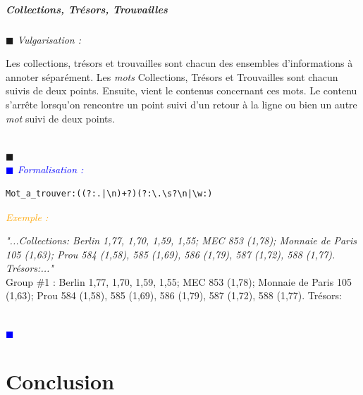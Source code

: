 \documentclass[a4paper, 11pt]{report}
\newenvironment{vulgarisation}
    {
    \textit{\textcolor{dark-blue}{$\blacksquare$  Vulgarisation : \\}}

    }
    {
    ~\\\textcolor{dark-blue}{$\blacksquare$}\\
    }
\newenvironment{formalisation}
    {
    \textit{\textcolor{blue}{$\blacksquare$  Formalisation : \\}}
    }
    {
    ~\\\textcolor{blue}{$\blacksquare$}\\
    }
\newenvironment{exemple}
    {
    \textit{\textcolor{orange}{
    Exemple : \\}}
    }
    {\\
    }
\begin{document}
\subsubsection{Collections, Trésors, Trouvailles}
\begin{vulgarisation}
Les collections, trésors et trouvailles sont chacun des ensembles d'informations à annoter séparément.
	Les \textit{mots} Collections, Trésors et Trouvailles sont chacun suivis de deux points. Ensuite, vient le contenus concernant ces mots. Le contenu s'arrête lorsqu'on rencontre un point suivi d'un retour à la ligne ou bien un autre \textit{mot} suivi de deux points.
\end{vulgarisation}
\begin{formalisation}
	\begin{verbatim}
Mot_a_trouver:((?:.|\n)+?)(?:\.\s?\n|\w:)
	\end{verbatim}
	\begin{exemple}
		\emph{"...Collections: Berlin 1,77, 1,70, 1,59,
			1,55; MEC 853 (1,78); Monnaie de Paris 105 (1,63); Prou 584 (1,58), 585 (1,69), 586 (1,79), 587 
			(1,72), 588 (1,77). Trésors:..."}\\
		Group \#1 :  Berlin 1,77, 1,70, 1,59,
		1,55; MEC 853 (1,78); Monnaie de Paris 105 (1,63); Prou 584 (1,58), 585 (1,69), 586 (1,79), 587 (1,72), 588 (1,77). Trésors:
	\end{exemple}
\end{formalisation}


\part{Conclusion}
\end{document}

